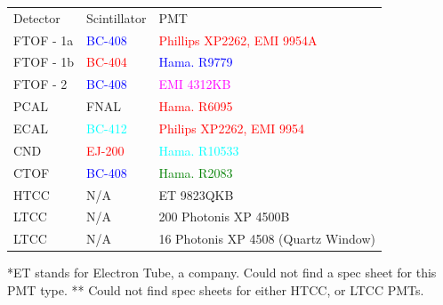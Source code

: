             \begin{table}[H]
                \centering
                    \begin{tabular}{lll}
                        Detector    &   Scintillator                         &   PMT   \\
                        FTOF - 1a   &     \textcolor{blue}{BC-408}           &   \textcolor{red}{Phillips XP2262, EMI 9954A}\\
                        FTOF - 1b   &     \textcolor{red}{BC-404}           &   \textcolor{blue}{Hama. R9779} \\
                        FTOF - 2    &     \textcolor{blue}{BC-408}           &   \textcolor{magenta}{EMI 4312KB} \\
                        PCAL        &     FNAL                               &   \textcolor{red}{Hama. R6095}\\
                        ECAL        &     \textcolor{cyan}{BC-412}           &   \textcolor{red}{Philips XP2262, EMI 9954}\\
                        CND         &     \textcolor{red}{EJ-200}            &   \textcolor{cyan}{Hama. R10533} \\
                        CTOF        &     \textcolor{blue}{BC-408}           &   \textcolor{green}{Hama. R2083} \\
                        HTCC        &         N/A                            &   ET 9823QKB \\
                        LTCC        &           N/A                          &   200 Photonis XP 4500B\\
                        LTCC        &              N/A                       &   16 Photonis XP 4508 (Quartz Window)\\
                    \end{tabular}
            \end{table}
            
            *ET stands for Electron Tube, a company. Could not find a spec sheet for this PMT type. 
            ** Could not find spec sheets for either HTCC, or LTCC PMTs. 
       
